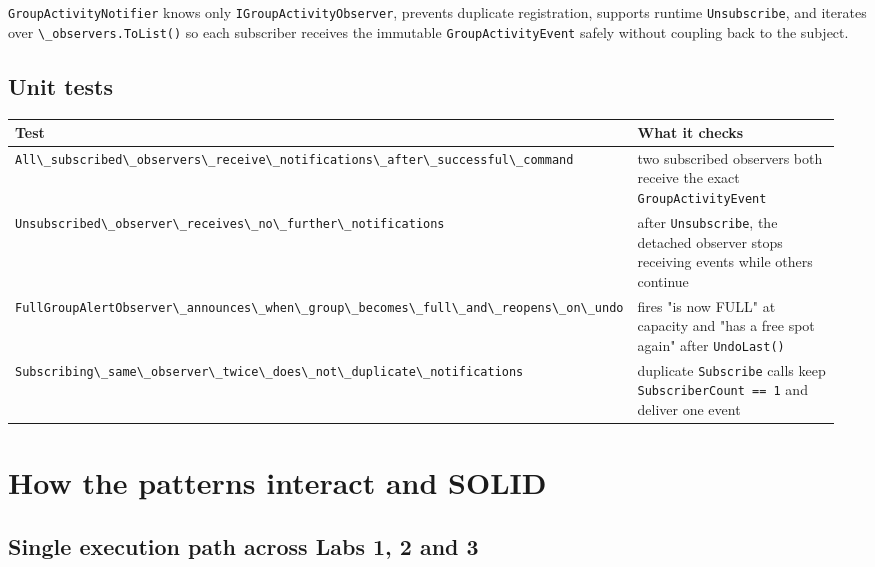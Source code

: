 \documentclass{utmreport}
\providecommand{\passthrough}[1]{#1}
\newcounter{none}
\begin{document}
\passthrough{\lstinline!GroupActivityNotifier!} knows only \passthrough{\lstinline!IGroupActivityObserver!}, prevents duplicate registration, supports runtime \passthrough{\lstinline!Unsubscribe!}, and iterates over \passthrough{\lstinline!\_observers.ToList()!} so each subscriber receives the immutable \passthrough{\lstinline!GroupActivityEvent!} safely without coupling back to the subject.

\section{Unit tests}

{\def\LTcaptype{none} %
\begin{longtable}[]{@{}>{\raggedright\arraybackslash}p{0.480\linewidth}>{\raggedright\arraybackslash}p{0.480\linewidth}@{}}
\toprule\noalign{}
Test & What it checks \\
\midrule\noalign{}
\endhead
\bottomrule\noalign{}
\endlastfoot
\passthrough{\lstinline!All\_subscribed\_observers\_receive\_notifications\_after\_successful\_command!} & two subscribed observers both receive the exact \passthrough{\lstinline!GroupActivityEvent!} \\
\passthrough{\lstinline!Unsubscribed\_observer\_receives\_no\_further\_notifications!} & after \passthrough{\lstinline!Unsubscribe!}, the detached observer stops receiving events while others continue \\
\passthrough{\lstinline!FullGroupAlertObserver\_announces\_when\_group\_becomes\_full\_and\_reopens\_on\_undo!} & fires "is now FULL" at capacity and "has a free spot again" after \passthrough{\lstinline!UndoLast()!} \\
\passthrough{\lstinline!Subscribing\_same\_observer\_twice\_does\_not\_duplicate\_notifications!} & duplicate \passthrough{\lstinline!Subscribe!} calls keep \passthrough{\lstinline!SubscriberCount == 1!} and deliver one event \\
\end{longtable}
}

\chapter{How the patterns interact and SOLID}

\section{Single execution path across Labs 1, 2 and 3}
\end{document}
